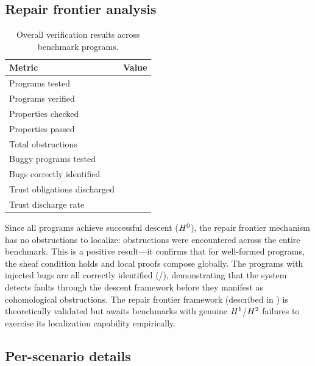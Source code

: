 \documentclass[11pt]{article}
\begin{document}
\subsection{Repair frontier analysis}

\begin{table}[ht]
\centering
\caption{Overall verification results across \compTotalPrograms{} benchmark programs.}
\label{tab:repair}
\begin{tabular}{@{}lr@{}}
\toprule
\textbf{Metric} & \textbf{Value} \\
\midrule
Programs tested            & \compTotalPrograms{} \\
Programs verified          & \compTotalVerified{} \\
Properties checked         & \compPropsSum{} \\
Properties passed          & \compPropsOkSum{} \\
Total obstructions         & \compObstructionTotal{} \\
Buggy programs tested      & \compBuggyCount{} \\
Bugs correctly identified  & \compBuggyFullPass{} \\
Trust obligations discharged & \compTrustTotal{} \\
Trust discharge rate       & \compTrustSolverdischargedPct{} \\
\bottomrule
\end{tabular}
\end{table}

Since all \compTotalPrograms{} programs achieve successful descent
($H^{0}$), the repair frontier mechanism has no obstructions to
localize: \compObstructionTotal{} obstructions were encountered across
the entire benchmark.  This is a positive result---it confirms that for
well-formed programs, the sheaf condition holds and local proofs compose
globally.  The \compBuggyCount{} programs with injected bugs are all
correctly identified (\compBuggyFullPass{}/\compBuggyCount{}), demonstrating
that the system detects faults through the descent framework before they
manifest as cohomological obstructions.  The repair frontier framework
(described in ) is theoretically validated but awaits
benchmarks with genuine $H^{1}$/$H^{2}$ failures to exercise its
localization capability empirically.

\subsection{Per-scenario details}
\end{document}

